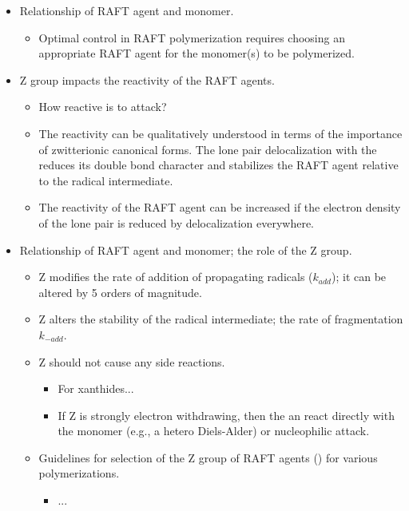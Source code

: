 \documentclass[../notes.tex]{subfiles}
\begin{document}
\begin{itemize}
\begin{itemize}
    \end{itemize}
    \item Relationship of RAFT agent and monomer.
    \begin{itemize}
        \item Optimal control in RAFT polymerization requires choosing an appropriate RAFT agent for the monomer(s) to be polymerized.
    \end{itemize}
    \item Z group impacts the reactivity of the RAFT agents.
    \begin{itemize}
        \item How reactive is  to attack?
        \item The reactivity can be qualitatively understood in terms of the importance of zwitterionic canonical forms. The lone pair delocalization with the  reduces its double bond character and stabilizes the RAFT agent relative to the radical intermediate.
        \item The reactivity of the RAFT agent can be increased if the electron density of the lone pair is reduced by delocalization everywhere.
    \end{itemize}
    \item Relationship of RAFT agent and monomer; the role of the Z group.
    \begin{itemize}
        \item Z modifies the rate of addition of propagating radicals ($k_{add}$); it can be altered by 5 orders of magnitude.
        \item Z alters the stability of the radical intermediate; the rate of fragmentation $k_{-add}$.
        \item Z should not cause any side reactions.
        \begin{itemize}
            \item For xanthides...
            \item If Z is strongly electron withdrawing, then the  an react directly with the monomer (e.g., a hetero Diels-Alder) or nucleophilic attack.
        \end{itemize}
        \item Guidelines for selection of the Z group of RAFT agents () for various polymerizations.
        \begin{itemize}
            \item ...
        \end{itemize}
    \end{itemize}

\end{itemize}
\end{document}
